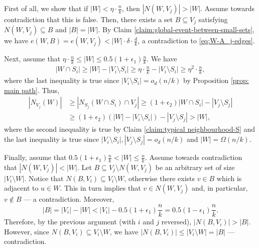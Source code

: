 \documentclass[notitlepage]{scrartcl}
\begin{document}
First of all, we show that if $|W| < \eta \cdot \frac{n}{k}$, then $|N(W, V_j)| > |W|$. Assume towards contradiction that this is false. Then, there exists a set $B \subseteq V_j$ satisfying $N(W, V_j) \subseteq B$ and $|B| = |W|$. By Claim \ref{claim:global-event-between-small-sets}, we have $e(W, B) = e(W, V_j) < |W| \cdot \delta \cdot \frac{d}{k}$, a contradiction to \eqref{eq:W-A_j-edges}.

Next, assume that $\eta \cdot \frac{n}{k} \le |W| \le 0.5(1 + \epsilon_1) \frac{n}{k}$. We have
\begin{align*}        
    |W \cap S_i| \ge |W| - |V_i \setminus S_i| \ge \eta \cdot \frac{n}{k} - |V_i \setminus S_i| \ge \eta^2 \cdot \frac{n}{k},
\end{align*}
where the last inequality is true since $|V_i \setminus S_i| = o_d(n/k)$ by Proposition \ref{prop: main path}. Thus,
\begin{align*}
    |N_{V_j}(W)| &\ge |N_{S_j}(W \cap S_i) \cap V_j| \ge (1 + \epsilon_2) |W \cap S_i| - |V_j \setminus S_j| \\
    &\ge (1 + \epsilon_2)(|W| - |V_i \setminus S_i|) - |V_j \setminus S_j| > |W|,
\end{align*}
where the second inequality is true by Claim \ref{claim:typical neighbourhood-S} and the last inequality is true since $|V_i \setminus S_i|, |V_j \setminus S_j| = o_d(n/k)$ and $|W| = \Omega(n/k)$.

Finally, assume that $0.5(1 + \epsilon_1) \frac{n}{k} < |W| \le \frac{n}{k}$. Assume towards contradiction that $|N(W, V_j)| < |W|$. Let $B \subseteq V_j \setminus N(W, V_j)$ be an arbitrary set of size $|V_i \setminus W|$. Notice that $N(B, V_i) \subseteq V_i \setminus W$, otherwise there exists $v \in B$ which is adjacent to $u \in W$. This in turn implies that $v \in N(W, V_j)$ and, in particular, $v \notin B$ --- a contradiction. Moreover, 
\[
    |B| = |V_i| - |W| < |V_i| - 0.5(1 + \epsilon_1) \frac{n}{k} = 0.5(1-\epsilon_1) \frac{n}{k}.
\]
Therefore, by the previous argument (with $i$ and $j$ reversed), $|N(B, V_i)| > |B|$. However, since $N(B, V_i) \subseteq V_i \setminus W$, we have $|N(B, V_i)| \le |V_i \setminus W| = |B|$ --- contradiction.

\end{document}
